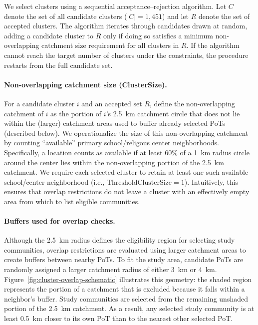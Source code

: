 \documentclass[12pt,a4paper]{article}
\begin{document}
We select clusters using a sequential acceptance--rejection algorithm. Let \(C\) denote the set of all candidate clusters
(\(|C|=1{,}451\)) and let \(R\) denote the set of accepted clusters. The algorithm iterates through candidates drawn
at random, adding a candidate cluster to \(R\) only if doing so satisfies a minimum non-overlapping catchment size
requirement for all clusters in \(R\). If the algorithm cannot reach the target number of clusters under the
constraints, the procedure restarts from the full candidate set.

\paragraph{Non-overlapping catchment size (ClusterSize).}
For a candidate cluster \(i\) and an accepted set \(R\), define the non-overlapping catchment of \(i\) as the
portion of \(i\)'s 2.5~km catchment circle that does not lie within the (larger) catchment areas used to buffer
already selected PoTs (described below). We operationalize the size of this non-overlapping catchment by counting
``available'' primary school/religous center neighborhoods. Specifically, a location counts as available if at least 60\% of a 1~km radius
circle around the center lies within the non-overlapping portion of the 2.5~km catchment. We require each selected cluster to retain at least one such
available school/center neighborhood (i.e., \(\text{ThresholdClusterSize}=1\)). Intuitively, this ensures that overlap
restrictions do not leave a cluster with an effectively empty area from which to list eligible communities.

\paragraph{Buffers used for overlap checks.}
Although the 2.5~km radius defines the eligibility region for selecting study communities, overlap restrictions are
evaluated using larger catchment areas to create buffers between nearby PoTs. To fit the study area, candidate PoTs are randomly assigned a larger catchment radius of either 3~km or 4~km. Figure~\ref{fig:cluster-overlap-schematic} illustrates this geometry: the shaded region represents the portion of a catchment that is excluded because it falls within a neighbor's buffer. Study communities are selected from the remaining unshaded portion of the 2.5~km catchment. As a result, any selected study community is at least 0.5~km closer to its own PoT than to the nearest other selected PoT.
\end{document}
